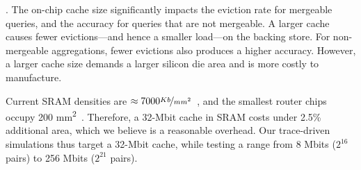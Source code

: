 .  The on-chip cache size significantly impacts the
eviction rate for mergeable queries, and the accuracy for queries that are not
mergeable. A larger cache causes fewer evictions---and hence a smaller load---on
the backing store. For non-mergeable aggregations, fewer evictions also produces
a higher accuracy. However, a larger cache size demands a larger silicon die
area and is more costly to manufacture.

Current SRAM densities are
$\approx7000\nicefrac{Kb}{mm^2}$~\cite{sram_estimate}, and the smallest
router chips occupy 200 \si{\milli\metre\squared}~\cite{gibb_parsing}.
Therefore, a 32-Mbit cache in SRAM costs under 2.5\% additional area, which we believe is a reasonable overhead. Our trace-driven simulations thus target a 32-Mbit cache, while testing
a range from 8 Mbits ($2^{16}$ pairs) to 256 Mbits ($2^{21}$ pairs).

